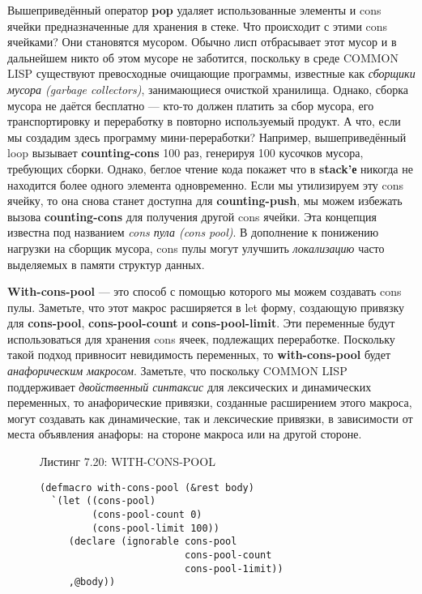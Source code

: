 Вышеприведённый оператор \textbf{pop} удаляет использованные элементы и cons ячейки предназначенные для хранения в стеке. Что происходит с этими cons ячейками? Они становятся мусором. Обычно лисп отбрасывает этот мусор и в дальнейшем никто об этом мусоре не заботится, поскольку в среде COMMON LISP существуют превосходные очищающие программы, известные как \emph{сборщики мусора (garbage collectors)}, занимающиеся очисткой хранилища. Однако, сборка мусора не даётся бесплатно --- кто-то должен платить за сбор мусора, его транспортировку и переработку в повторно используемый продукт. А что, если мы создадим здесь программу мини-переработки? Например, вышеприведённый loop вызывает \textbf{counting-cons} 100 раз, генерируя 100 кусочков мусора, требующих сборки. Однако, беглое чтение кода покажет что в \textbf{stack'е} никогда не находится более одного элемента одновременно. Если мы утилизируем эту cons ячейку, то она снова станет доступна для \textbf{counting-push}, мы можем избежать вызова \textbf{counting-cons} для получения другой cons ячейки. Эта концепция известна под названием \emph{cons пула (cons pool)}. В дополнение к понижению нагрузки на сборщик мусора, cons пулы могут улучшить \emph{локализацию} часто выделяемых в памяти структур данных.

\textbf{With-cons-pool} --- это способ с помощью которого мы можем создавать cons пулы. Заметьте, что этот макрос расширяется в let форму, создающую привязку для \textbf{cons-pool}, \textbf{cons-pool-count} и \textbf{cons-pool-limit}. Эти переменные будут использоваться для хранения cons ячеек, подлежащих переработке. Поскольку такой подход привносит невидимость переменных, то \textbf{with-cons-pool} будет \emph{анафорическим макросом}. Заметьте, что поскольку COMMON LISP поддерживает \emph{двойственный синтаксис} для лексических и динамических переменных, то анафорические привязки, созданные расширением этого макроса, могут создавать как динамические, так и лексические привязки, в зависимости от места объявления анафоры: на стороне макроса или на другой стороне.

\begin{figure}Листинг 7.20: WITH-CONS-POOL\label{listing_7.20}
\listbegin
\begin{verbatim}
(defmacro with-cons-pool (&rest body)
  `(let ((cons-pool)
         (cons-pool-count 0)
         (cons-pool-limit 100))
     (declare (ignorable cons-pool
                         cons-pool-count
                         cons-pool-1imit))
     ,@body))
\end{verbatim}
\listend
\end{figure}

